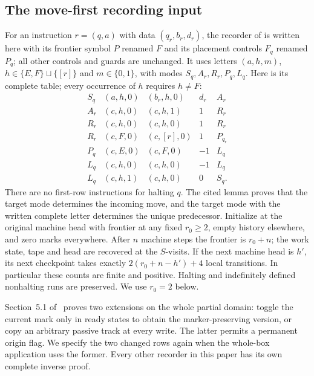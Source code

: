 \subsection{The move-first recording input}
\label{sv:recorder-import}
For an instruction $r=(q,a)$ with data $(q_r,b_r,d_r)$, the recorder
of \cite[Lemma~2.1]{Entry} is written here with its frontier symbol
$P$ renamed $F$ and its placement controls $F_q$ renamed $P_q$;
all other controls and guards are unchanged. It uses letters $(a,h,m)$,
$h\in\{E,F\}\sqcup\{[r]\}$ and $m\in\{0,1\}$,
with modes $S_q,A_r,R_r,P_q,L_q$.  Here is its complete table;
every occurrence of $h$ requires $h\ne F$:
\[
\begin{array}{c|c|c|c|c}
S_q&(a,h,0)&(b_r,h,0)&d_r&A_r\\
A_r&(c,h,0)&(c,h,1)&1&R_r\\
R_r&(c,h,0)&(c,h,0)&1&R_r\\
R_r&(c,F,0)&(c,[r],0)&1&P_{q_r}\\
P_q&(c,E,0)&(c,F,0)&-1&L_q\\
L_q&(c,h,0)&(c,h,0)&-1&L_q\\
L_q&(c,h,1)&(c,h,0)&0&S_q.
\end{array}
\]
There are no first-row instructions for halting $q$.  The cited lemma proves
that the target mode determines the incoming move, and the target mode
with the written complete letter determines the unique predecessor.
Initialize at the original machine head with frontier at any fixed
$r_0\ge2$, empty history elsewhere, and zero marks everywhere.
After $n$ machine steps the frontier is $r_0+n$; the work state,
tape and head are recovered at the $S$-visits.  If the next machine
head is $h'$, its next checkpoint takes exactly
$2(r_0+n-h')+4$ local transitions.  In particular these counts
are finite and positive.  Halting and indefinitely defined nonhalting
runs are preserved.  We use $r_0=2$ below.

Section~5.1 of~\cite{Entry} proves two extensions on the whole partial
domain: toggle the current mark only in ready states to obtain the
marker-preserving version, or copy an arbitrary passive track at every
write.  The latter permits a permanent origin flag.  We specify the
two changed rows again when the whole-box application uses the former.
Every other recorder in this paper has its own complete inverse proof.
